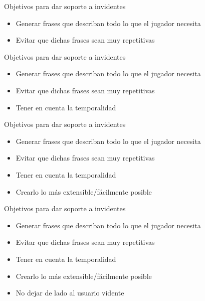\begin{tframe}{Objetivos para dar soporte a invidentes}
	\begin{itemize}
		\item Generar frases que describan todo lo que el jugador necesita
		\item<+-| alert@+> Evitar que dichas frases sean muy repetitivas
	\end{itemize}
\end{tframe}

\begin{tframe}{Objetivos para dar soporte a invidentes}
	\begin{itemize}
		\item Generar frases que describan todo lo que el jugador necesita
		\item Evitar que dichas frases sean muy repetitivas
		\item<+-| alert@+> Tener en cuenta la temporalidad
	\end{itemize}
\end{tframe}

\begin{tframe}{Objetivos para dar soporte a invidentes}
	\begin{itemize}
		\item Generar frases que describan todo lo que el jugador necesita
		\item Evitar que dichas frases sean muy repetitivas
		\item Tener en cuenta la temporalidad
		\item<+-| alert@+> Crearlo lo más extensible/fácilmente posible
	\end{itemize}
\end{tframe}

\begin{tframe}{Objetivos para dar soporte a invidentes}
	\begin{itemize}
		\item Generar frases que describan todo lo que el jugador necesita
		\item Evitar que dichas frases sean muy repetitivas
		\item Tener en cuenta la temporalidad
		\item Crearlo lo más extensible/fácilmente posible
		\item<+-| alert@+> No dejar de lado al usuario vidente
	\end{itemize}
\end{tframe}



